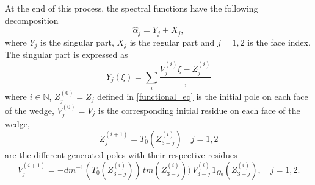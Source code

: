 At the end of this process, the spectral functions have the following decomposition
\begin{equation}
\label{spec_decomp}
\hat{\alpha}_j=Y_j+X_j, 
\end{equation}
where  $Y_j$ is the singular part, $X_j$ is the regular part  and $j=1,2$ is the face index. The singular part is expressed as
\begin{equation}
\label{sing_part}
 Y_j(\xi) = \sum_i \dfrac{{V_j^{(i)}}{\xi - Z_j^{(i)}}},
\end{equation}
where $i \in \mathbb{N}$, $Z_j^{(0)} = Z_j$ defined in \eqref{functional_eq} is the initial pole on each face of the wedge, $V_j^{(0)}=V_j$ is the corresponding initial residue on each face of the wedge, 
\begin{equation}
\label{Generated_poles}
Z_j^{(i+1)} = T_0(Z_{3-j}^{(i)}) \quad j=1,2
\end{equation} 
are the different generated poles with their respective residues 
\begin{equation}
\label{Generated_residues}
V_j^{(i+1)}=-dm^{-1}(T_0(Z_{3-j}^{(i)})) \,  tm(Z_{3-j}^{(i)})) \, V_{3-j}^{(i)} \, 1_{\Omega_0}(Z_{3-j}^{(i)}), \quad  j=1,2.
\end{equation}
